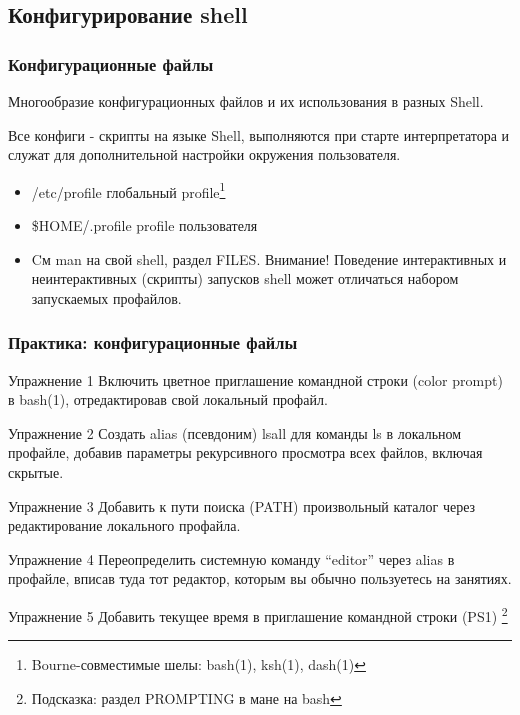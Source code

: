 \subsection{Конфигурирование shell}
\begin{frame}
  \frametitle{Конфигурационные файлы}
  Многообразие конфигурационных файлов и их использования в разных Shell.

  Все конфиги - скрипты на языке Shell, выполняются при старте интерпретатора и служат для дополнительной настройки окружения пользователя. 

  \begin{itemize}
    \item \alert{/etc/profile} глобальный profile\footnote{Bourne-совместимые шелы: bash(1), ksh(1), dash(1)}
    \item \alert{\$HOME/.profile} profile пользователя \pause
    \item Cм man на свой shell, раздел FILES. \newline
      \alert{Внимание!} Поведение интерактивных и неинтерактивных (скрипты) запусков shell может отличаться набором запускаемых профайлов. 
  \end{itemize}

\end{frame}

\begin{frame}
  \frametitle{Практика: конфигурационные файлы}

  \alert{Упражнение 1} Включить цветное приглашение командной строки (color prompt) в bash(1), отредактировав свой локальный профайл.

  \alert{Упражнение 2} Создать alias (псевдоним) lsall для команды ls в локальном профайле, добавив параметры рекурсивного просмотра всех файлов, включая скрытые.

  \alert{Упражнение 3} Добавить к пути поиска (PATH) произвольный каталог через редактирование локального профайла.

  \alert{Упражнение 4} Переопределить системную команду ``editor'' через alias в профайле, вписав туда тот редактор, которым вы обычно пользуетесь на занятиях.

  \alert{Упражнение 5} Добавить текущее время в приглашение командной строки (PS1) \footnote{Подсказка: раздел PROMPTING в мане на bash}

\end{frame}

